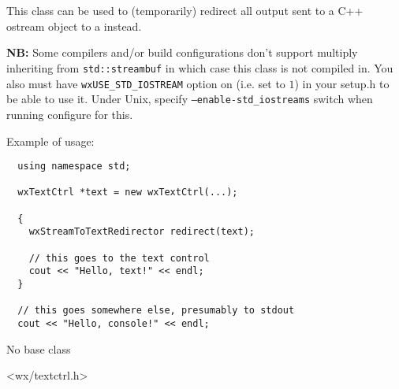 
\section{}\label{wxstreamtotextredirector}

This class can be used to (temporarily) redirect all output sent to a C++
ostream object to a  instead.

{\bf NB:} Some compilers and/or build configurations don't support multiply
inheriting  from {\tt std::streambuf} in which
case this class is not compiled in. You also must have {\tt wxUSE\_STD\_IOSTREAM} 
option on (i.e. set to $1$) in your setup.h to be able to use it. Under Unix,
specify {\tt --enable-std\_iostreams} switch when running configure for this.

Example of usage:
{\small%
\begin{verbatim}
  using namespace std;

  wxTextCtrl *text = new wxTextCtrl(...);

  {
    wxStreamToTextRedirector redirect(text);

    // this goes to the text control
    cout << "Hello, text!" << endl;
  }

  // this goes somewhere else, presumably to stdout
  cout << "Hello, console!" << endl;
\end{verbatim}
}%


No base class


<wx/textctrl.h>




\label{wxstreamtotextredirectorctor}



